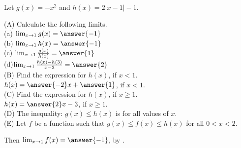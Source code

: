\documentclass{ximera}
\author{Nela Lakos \and Kyle Parsons}
\begin{document}
\begin{exercise}

Let $g(x) = -x^2$ and $h(x) =  2\left|x-1\right|-1$.

(A) Calculate the following limits.\\[1em]
(a) $\lim_{x\to1}g(x) = \answer{-1}$\\

(b) $\lim_{x\to1}h(x)= \answer{-1}$\\

(c) $\lim_{x\to1}\frac{g(x)}{h(x)} = \answer{1}$\\ 

(d)$\lim_{x\to1}\frac{h(x)-h(3)}{x-3} = \answer{2}$\\[1em]


(B)  Find the expression for $h(x)$, if $x<1$.\\[1em]

$h(x)=\answer{-2}x +\answer{1}$,  if $x<1$. \\[1em]

(C)  Find the expression for $h(x)$, if $x\ge1$.\\[1em]

$h(x)=\answer{2}x -3$, if $x\ge1$.\\[1em]

(D) The inequality:   $g(x) \leq h(x)$    is  for all values of $x$.\\[1em]
     
(E) Let $f$ be a function such that $g(x) \leq f(x) \leq h(x)$ for all $0 < x < 2$.

Then $\lim_{x\to1}f(x) = \answer{-1}$, by  .


\end{exercise}
\end{document}
